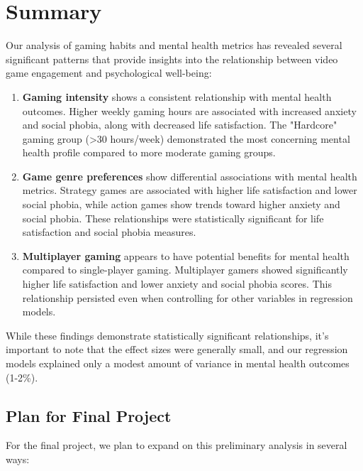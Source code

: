 \documentclass[12pt]{article}
\begin{document}
\section{Summary}

Our analysis of gaming habits and mental health metrics has revealed several significant patterns that provide insights into the relationship between video game engagement and psychological well-being:

\begin{enumerate}
    \item \textbf{Gaming intensity} shows a consistent relationship with mental health outcomes. Higher weekly gaming hours are associated with increased anxiety and social phobia, along with decreased life satisfaction. The "Hardcore" gaming group (\textgreater30 hours/week) demonstrated the most concerning mental health profile compared to more moderate gaming groups.

    \item \textbf{Game genre preferences} show differential associations with mental health metrics. Strategy games are associated with higher life satisfaction and lower social phobia, while action games show trends toward higher anxiety and social phobia. These relationships were statistically significant for life satisfaction and social phobia measures.

    \item \textbf{Multiplayer gaming} appears to have potential benefits for mental health compared to single-player gaming. Multiplayer gamers showed significantly higher life satisfaction and lower anxiety and social phobia scores. This relationship persisted even when controlling for other variables in regression models.
\end{enumerate}

\noindent
While these findings demonstrate statistically significant relationships, it's important to note that the effect sizes were generally small, and our regression models explained only a modest amount of variance in mental health outcomes (1-2\%).

\subsection{Plan for Final Project}

For the final project, we plan to expand on this preliminary analysis in several ways:
\end{document}
